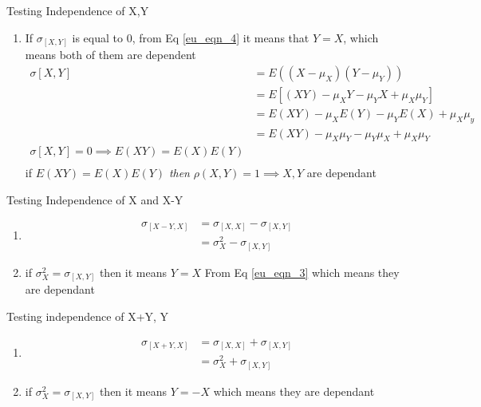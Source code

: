 \documentclass[10pt]{beamer}
\begin{document}
\begin{frame}{Testing Independence of X,Y}
\begin{enumerate}
\item If $\sigma_{[X,Y]}$ is equal to 0, from Eq \ref{eu_eqn_4} it means that $Y = X$, which means both of them are dependent\\
 \begin{align*}
        \sigma{[X,Y]} &= E((X-\mu_X) (Y-\mu_Y))\\
        &= E[(XY) - \mu_XY - \mu_YX + \mu_X\mu_Y] \\
        &= E(XY) - \mu_XE(Y) - \mu_YE(X) + \mu_X\mu_y\\
        &= E(XY) -\mu_X\mu_Y - \mu_Y\mu_X + \mu_X\mu_Y\\
        \sigma{[X,Y]} = 0 \implies E(XY) = E(X)E(Y) &\\
 \end{align*}
    if $E(XY) = E(X)E(Y)$ \textit{then} $\rho(X,Y) = 1 \implies X,Y$ are dependant
\end{enumerate}
\end{frame}

\begin{frame}{Testing Independence of X and X-Y }
\begin{enumerate}
\item \begin{align*}
    \sigma_{[X-Y,X]} &= \sigma_{[X,X]} - \sigma_{[X,Y]}\\
                     &= \sigma_{X}^2 - \sigma_{[X,Y]}
\end{align*}
\item if $\sigma_{X}^2 = \sigma_{[X,Y]}$ then it means $Y=X$ From Eq \ref{eu_eqn_3} which means they are dependant\\
\end{enumerate}
\end{frame}

\begin{frame}{Testing independence of X+Y, Y}
\begin{enumerate}
\item \begin{align*}
   \sigma_{[X+Y,X]} &= \sigma_{[X,X]} + \sigma_{[X,Y]}\\
                     &= \sigma_{X}^2 + \sigma_{[X,Y]}
\end{align*}
\item if $\sigma_{X}^2 = \sigma_{[X,Y]}$ then it means $Y=-X$ which means they are dependant\\
\end{enumerate}
\end{frame}
\end{document}
